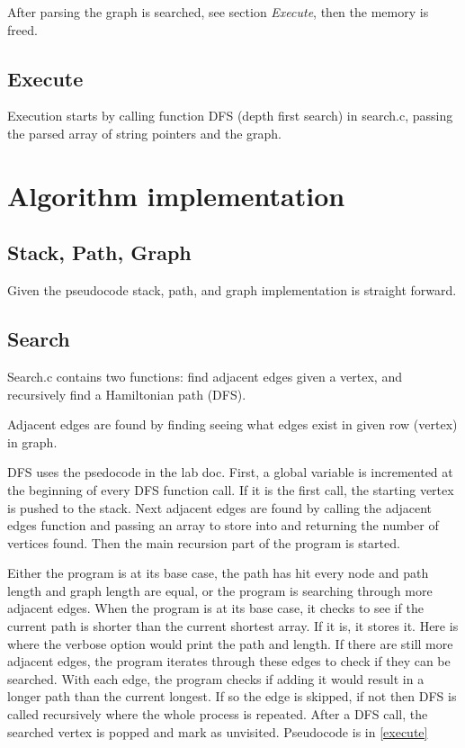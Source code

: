 \documentclass[12pt]{article}
\begin{document}
	After parsing the graph is searched, see section \emph{Execute}, then the memory is freed.

	\subsection{Execute}

	Execution starts by calling function DFS (depth first search) in search.c, passing the parsed array of string pointers and the graph.
	
	\section{Algorithm implementation}

	\subsection{Stack, Path, Graph}

	Given the pseudocode stack, path, and graph implementation is straight forward.

	\subsection{Search}

	Search.c contains two functions: find adjacent edges given a vertex, and recursively find a Hamiltonian path (DFS).

	Adjacent edges are found by finding seeing what edges exist in given row (vertex) in graph.

	DFS uses the psedocode in the lab doc.
	First, a global variable is incremented at the beginning of every DFS function call.
	If it is the first call, the starting vertex is pushed to the stack.
	Next adjacent edges are found by calling the adjacent edges function and passing an array to store into and returning the number of vertices found.
	Then the main recursion part of the program is started.

	Either the program is at its base case, the path has hit every node and path length and graph length are equal, or the program is searching through more adjacent edges. When the program is at its base case, it checks to see if the current path is shorter than the current shortest array. If it is, it stores it. Here is where the verbose option would print the path and length. If there are still more adjacent edges, the program iterates through these edges to check if they can be searched. With each edge, the program checks if adding it would result in a longer path than the current longest. If so the edge is skipped, if not then DFS is called recursively where the whole process is repeated. After a DFS call, the searched vertex is popped and mark as unvisited. Pseudocode is in \vref{execute}
\end{document}
